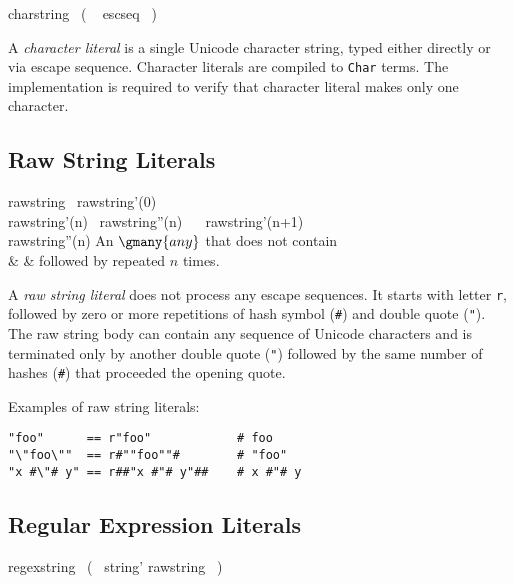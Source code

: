 \begin{bnf}
  charstring \eq {} \ ( \  \gor escseq \ ) \ 
\end{bnf}

A \emph{character literal} is a single Unicode character string, typed either directly or via escape sequence. Character literals are compiled to \lstinline{Char} terms. The implementation is required to verify that character literal makes only one character.

\subsection*{Raw String Literals}

\begin{bnf}
  rawstring      \eq {} \ rawstring'(0) \\
  rawstring'(n)  \eq    {} \ rawstring''(n) \ 
                 \gorln \term{\#} \ rawstring'(n+1) \ \term{\#} \\
  rawstring''(n) \eq \textnormal{An \(\gmany{any}\) that does not contain} \\
                 & & \textnormal{ followed by \term{\#} repeated \(n\) times.}
\end{bnf}

A \emph{raw string literal} does not process any escape sequences. It starts with letter \texttt{r}, followed by zero or more repetitions of hash symbol (\texttt{\#}) and double quote (\texttt{"}). The raw string body can contain any sequence of Unicode characters and is terminated only by another double quote (\texttt{"}) followed by the same number of hashes (\texttt{\#}) that proceeded the opening quote.

Examples of raw string literals:

\begin{lstlisting}
"foo"      == r"foo"            # foo
"\"foo\""  == r#""foo""#        # "foo"
"x #\"# y" == r##"x #"# y"##    # x #"# y
\end{lstlisting}

\subsection*{Regular Expression Literals}

\begin{bnf}
  regexstring \eq {} \ ( \ string' \gor rawstring \ )
\end{bnf}

